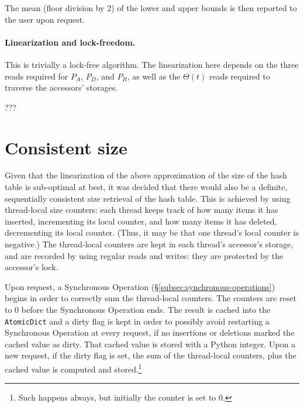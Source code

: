 The mean (floor division by 2) of the lower and upper bounds is then reported to the user upon request.

\paragraph{Linearization and lock-freedom.}
This is trivially a lock-free algorithm.
The linearization here depends on the three reads required for $P_A$, $P_D$, and $P_R$, as well as the $\Theta(t)$ reads required to traverse the accessors' storages.

???

\section{Consistent size}\label{sec:consistent-size}

Given that the linearization of the above approximation of the size of the hash table is sub-optimal at best, it was decided that there would also be a definite, sequentially consistent size retrieval of the hash table.
This is achieved by using thread-local size counters: each thread keeps track of how many items it has inserted, incrementing its local counter, and how many items it has deleted, decrementing its local counter.
(Thus, it may be that one thread's local counter is negative.)
The thread-local counters are kept in each thread's accessor's storage, and are recorded by using regular reads and writes: they are protected by the accessor's lock.

Upon request, a Synchronous Operation (\S\ref{subsec:synchronous-operations}) begins in order to correctly sum the thread-local counters.
The counters are reset to 0 before the Synchronous Operation ends.
The result is cached into the \texttt{AtomicDict} and a dirty flag is kept in order to possibly avoid restarting a Synchronous Operation at every request, if no insertions or deletions marked the cached value as dirty.
That cached value is stored with a Python integer.
Upon a new request, if the dirty flag is set, the sum of the thread-local counters, plus the cached value is computed and stored.\footnote{%
	Such happens always, but initially the counter is set to 0.
}

